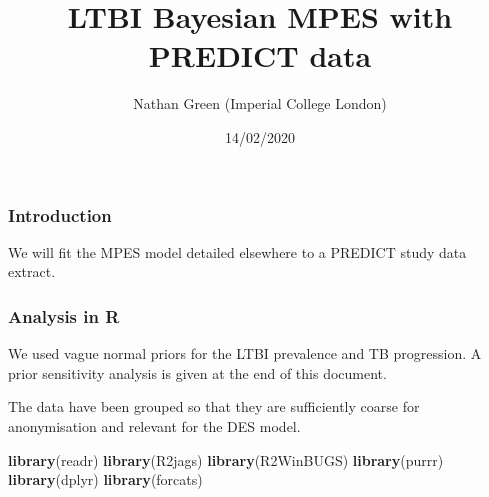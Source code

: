 \documentclass[]{article}
\title{LTBI Bayesian MPES with PREDICT data}
\author{Nathan Green (Imperial College London)}
\date{14/02/2020}
\newenvironment{Shaded}{\begin{snugshade}}{\end{snugshade}}
\newcommand{\KeywordTok}[1]{\textcolor[rgb]{0.13,0.29,0.53}{\textbf{#1}}}
\newcommand{\NormalTok}[1]{#1}
\begin{document}
\maketitle

\hypertarget{introduction}{%
\subsubsection{Introduction}\label{introduction}}

We will fit the MPES model detailed elsewhere to a PREDICT study data
extract.

\hypertarget{analysis-in-r}{%
\subsubsection{Analysis in R}\label{analysis-in-r}}

We used vague normal priors for the LTBI prevalence and TB progression.
A prior sensitivity analysis is given at the end of this document.

The data have been grouped so that they are sufficiently coarse for
anonymisation and relevant for the DES model.

\begin{Shaded}
\begin{Highlighting}[]
\KeywordTok{library}\NormalTok{(readr)}
\KeywordTok{library}\NormalTok{(R2jags)}
\KeywordTok{library}\NormalTok{(R2WinBUGS)}
\KeywordTok{library}\NormalTok{(purrr)}
\KeywordTok{library}\NormalTok{(dplyr)}
\KeywordTok{library}\NormalTok{(forcats)}
\end{Highlighting}
\end{Shaded}
\end{document}
